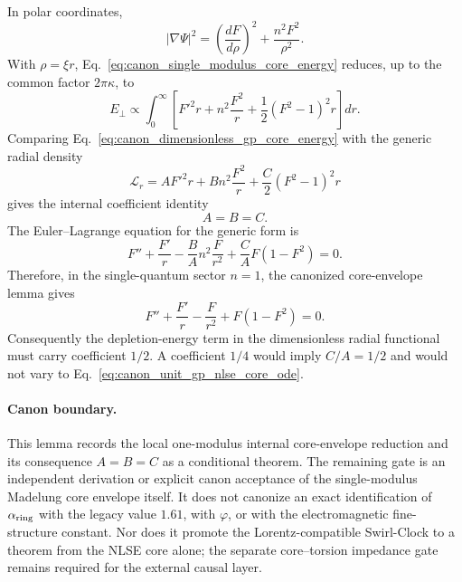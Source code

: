 In polar coordinates,
\begin{equation}
    |\nabla\Psi|^2
    =
    \left(\frac{dF}{d\rho}\right)^2
    +\frac{n^2F^2}{\rho^2} .
\end{equation}
With \(\rho=\xi r\), Eq.~\eqref{eq:canon_single_modulus_core_energy} reduces,
up to the common factor \(2\pi\kappa\), to
\begin{equation}
    E_\perp
    \propto
    \int_0^\infty
    \left[
        F'^2r
        +n^2\frac{F^2}{r}
        +\frac12(F^2-1)^2r
    \right]dr .
    \label{eq:canon_dimensionless_gp_core_energy}
\end{equation}
Comparing Eq.~\eqref{eq:canon_dimensionless_gp_core_energy} with the generic
radial density
\begin{equation}
    \mathcal L_r
    =
    A F'^2 r
    +B n^2\frac{F^2}{r}
    +\frac{C}{2}(F^2-1)^2r
\end{equation}
gives the internal coefficient identity
\begin{equation}
    \boxed{A=B=C.}
    \label{eq:canon_internal_abc_identity}
\end{equation}
The Euler--Lagrange equation for the generic form is
\begin{equation}
    F''+\frac{F'}{r}
    -\frac{B}{A}n^2\frac{F}{r^2}
    +\frac{C}{A}F(1-F^2)=0 .
\end{equation}
Therefore, in the single-quantum sector \(n=1\), the canonized core-envelope
lemma gives
\begin{equation}
    \boxed{
    F''+\frac{F'}{r}-\frac{F}{r^2}+F(1-F^2)=0 .
    }
    \label{eq:canon_unit_gp_nlse_core_ode}
\end{equation}
Consequently the depletion-energy term in the dimensionless radial functional
must carry coefficient \(1/2\).  A coefficient \(1/4\) would imply
\(C/A=1/2\) and would not vary to Eq.~\eqref{eq:canon_unit_gp_nlse_core_ode}.

\paragraph{Canon boundary.}
This lemma records the local one-modulus internal core-envelope reduction and
its consequence \(A=B=C\) as a conditional theorem.  The remaining gate is an
independent derivation or explicit canon acceptance of the single-modulus
Madelung core envelope itself.  It does not canonize an exact identification of
\(\alpha_{\rm ring}\) with the legacy value \(1.61\), with \(\varphi\), or with
the electromagnetic fine-structure constant.  Nor does it promote the
Lorentz-compatible Swirl-Clock to a theorem from the NLSE core alone; the
separate core--torsion impedance gate remains required for the external causal
layer.

